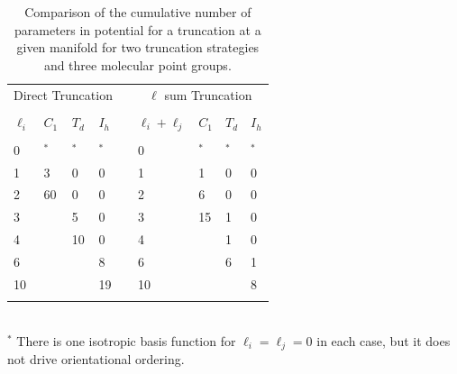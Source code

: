 \documentclass[preprint]{revtex4}
\begin{document}
\pagebreak

\begin{table}[!ht]
\caption{Comparison of the cumulative number of parameters in
potential for a truncation at a given manifold for two truncation
strategies and three molecular point groups.}\label{tab:truncation}
\begin{tabular}{lllllllll}%
\multicolumn{4}{c}{Direct Truncation} & &\multicolumn{4}{c}{$\ell$ sum Truncation}\\
\cline{1-4}\cline{6-9}\\
$\ell_i$ & $C_1$ & $T_d$ & $I_h$ & & $\ell_i+\ell_j$ & $C_1$ &
$T_d$ & $I_h$\\
\cline{1-4}\cline{6-9}\\
0  & $^*$  & $^*$  & $^*$  & & 0  & $^*$  & $^*$ & $^*$ \\
1  & 3  & 0  & 0  & & 1  & 1  & 0 & 0 \\
2  & 60 & 0  & 0  & & 2  & 6  & 0 & 0 \\
3  &    & 5  & 0  & & 3  & 15 & 1 & 0 \\
4  &    & 10 & 0  & & 4  &    & 1 & 0 \\
6  &    &    & 8  & & 6  &    & 6 & 1 \\
10 &    &    & 19 & & 10 &    &   & 8 \\
\cline{1-4}\cline{6-9}\\
\end{tabular}
\\$^*$ There is one isotropic basis function for $\ell_i=\ell_j=0$ in
each case, but it does not drive orientational ordering.
\end{table}

\pagebreak
\end{document}

